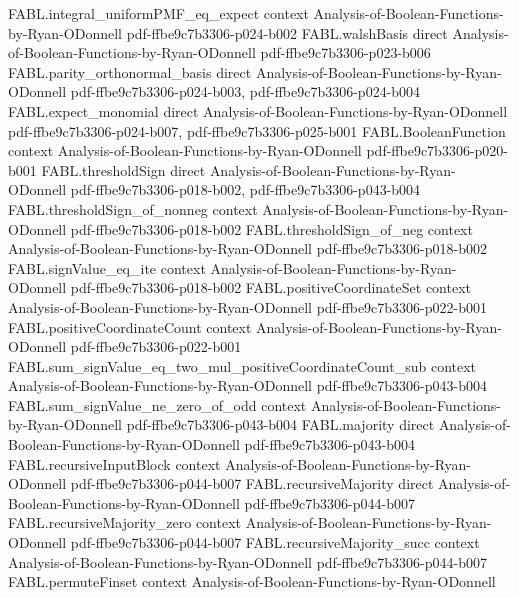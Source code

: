 \begin{theorem}
\proofstep
  {FABL.integral_uniformPMF_eq_expect}
  {context}
  {Analysis-of-Boolean-Functions-by-Ryan-ODonnell}
  {pdf-ffbe9c7b3306-p024-b002}
\proofstep
  {FABL.walshBasis}
  {direct}
  {Analysis-of-Boolean-Functions-by-Ryan-ODonnell}
  {pdf-ffbe9c7b3306-p023-b006}
\proofstep
  {FABL.parity_orthonormal_basis}
  {direct}
  {Analysis-of-Boolean-Functions-by-Ryan-ODonnell}
  {pdf-ffbe9c7b3306-p024-b003,
    pdf-ffbe9c7b3306-p024-b004}
\proofstep
  {FABL.expect_monomial}
  {direct}
  {Analysis-of-Boolean-Functions-by-Ryan-ODonnell}
  {pdf-ffbe9c7b3306-p024-b007,
    pdf-ffbe9c7b3306-p025-b001}
\proofstep
  {FABL.BooleanFunction}
  {context}
  {Analysis-of-Boolean-Functions-by-Ryan-ODonnell}
  {pdf-ffbe9c7b3306-p020-b001}
\proofstep
  {FABL.thresholdSign}
  {direct}
  {Analysis-of-Boolean-Functions-by-Ryan-ODonnell}
  {pdf-ffbe9c7b3306-p018-b002,
    pdf-ffbe9c7b3306-p043-b004}
\proofstep
  {FABL.thresholdSign_of_nonneg}
  {context}
  {Analysis-of-Boolean-Functions-by-Ryan-ODonnell}
  {pdf-ffbe9c7b3306-p018-b002}
\proofstep
  {FABL.thresholdSign_of_neg}
  {context}
  {Analysis-of-Boolean-Functions-by-Ryan-ODonnell}
  {pdf-ffbe9c7b3306-p018-b002}
\proofstep
  {FABL.signValue_eq_ite}
  {context}
  {Analysis-of-Boolean-Functions-by-Ryan-ODonnell}
  {pdf-ffbe9c7b3306-p018-b002}
\proofstep
  {FABL.positiveCoordinateSet}
  {context}
  {Analysis-of-Boolean-Functions-by-Ryan-ODonnell}
  {pdf-ffbe9c7b3306-p022-b001}
\proofstep
  {FABL.positiveCoordinateCount}
  {context}
  {Analysis-of-Boolean-Functions-by-Ryan-ODonnell}
  {pdf-ffbe9c7b3306-p022-b001}
\proofstep
  {FABL.sum_signValue_eq_two_mul_positiveCoordinateCount_sub}
  {context}
  {Analysis-of-Boolean-Functions-by-Ryan-ODonnell}
  {pdf-ffbe9c7b3306-p043-b004}
\proofstep
  {FABL.sum_signValue_ne_zero_of_odd}
  {context}
  {Analysis-of-Boolean-Functions-by-Ryan-ODonnell}
  {pdf-ffbe9c7b3306-p043-b004}
\proofstep
  {FABL.majority}
  {direct}
  {Analysis-of-Boolean-Functions-by-Ryan-ODonnell}
  {pdf-ffbe9c7b3306-p043-b004}
\proofstep
  {FABL.recursiveInputBlock}
  {context}
  {Analysis-of-Boolean-Functions-by-Ryan-ODonnell}
  {pdf-ffbe9c7b3306-p044-b007}
\proofstep
  {FABL.recursiveMajority}
  {direct}
  {Analysis-of-Boolean-Functions-by-Ryan-ODonnell}
  {pdf-ffbe9c7b3306-p044-b007}
\proofstep
  {FABL.recursiveMajority_zero}
  {context}
  {Analysis-of-Boolean-Functions-by-Ryan-ODonnell}
  {pdf-ffbe9c7b3306-p044-b007}
\proofstep
  {FABL.recursiveMajority_succ}
  {context}
  {Analysis-of-Boolean-Functions-by-Ryan-ODonnell}
  {pdf-ffbe9c7b3306-p044-b007}
\proofstep
  {FABL.permuteFinset}
  {context}
  {Analysis-of-Boolean-Functions-by-Ryan-ODonnell}

\end{theorem}
